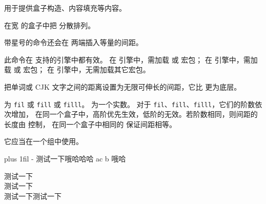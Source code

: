 \documentclass{cusdoc}
\begin{document}
 用于提供盒子构造、内容填充等内容。

\begin{function}{\spreadtext}
  \begin{syntax}
    \V\spreadtext   {} 
    \V\spreadtext *  
  \end{syntax}
在宽  的盒子中把  分散排列。

带星号的命令还会在  两端插入等量的间距。

此命令在 \CusLaTeX 支持的引擎中都有效。
在 \LuaLaTeX 引擎中，需加载  或  宏包；
在 \XeLaTeX 引擎中，需加载  或  宏包；
在 \upLaTeX 引擎中，无需加载其它宏包。
\end{function}

\begin{xample}

\stopxamplecode
\xampleprint
\end{xample}

\begin{function}{\useinfiniteskip}
  \begin{syntax}
    \V\useinfiniteskip {}
  \end{syntax}
把单词或 CJK 文字之间的距离设置为无限可伸长的间距，它比  更为底层。

 为 \texttt{fil} 或 \texttt{fill}
或 \texttt{filll}。 为一个实数。
对于 \texttt{fil}、\texttt{fill}、\texttt{filll}，它们的阶数依次增加，
在同一个盒子中，高阶优先生效，低阶的无效。若阶数相同，则间距的长度由  控制，
在同一个盒子中相同的  保证间距相等。

它应当在一个组中使用。
\end{function}

\begin{xample}
\parbox{8\ccwd}{%
   plus 1fil \parfillskip-\rightskip
  测试一下哦哈哈哈 ac b 哦哈}%
\quad
\parbox{5\ccwd}{%
  测试一下\\测试一下\\测试一下测试一下}
\stopxamplecode
\xampleprint
\end{xample}

\begin{xample}
\stopxamplecode
\xampleprint
\end{xample}
\end{document}

